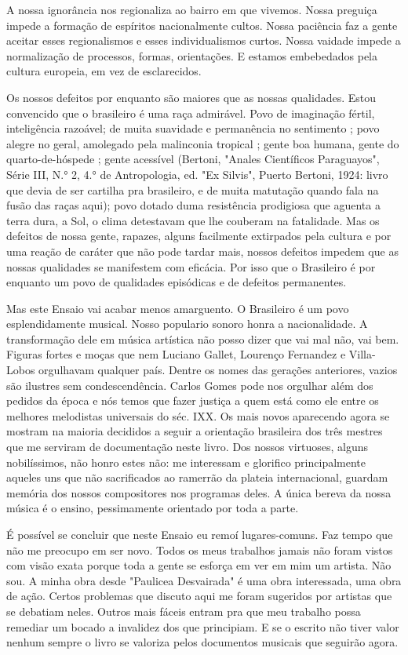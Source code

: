 A nossa ignorância nos regionaliza ao bairro em que vivemos. Nossa
preguiça impede a formação de espíritos nacionalmente cultos. Nossa
paciência faz a gente aceitar esses regionalismos e esses
individualismos curtos. Nossa vaidade impede a normalização de
processos, formas, orientações. E estamos embebedados pela cultura
europeia, em vez de esclarecidos.~

Os nossos defeitos por enquanto são maiores que as nossas qualidades.
Estou convencido que o brasileiro é uma raça admirável. Povo de
imaginação fértil, inteligência razoável; de muita suavidade e
permanência no sentimento ; povo alegre no geral, amolegado pela
malinconia tropical ; gente boa humana, gente do quarto-de-hóspede ;
gente acessível (Bertoni, "Anales Científicos Paraguayos", Série III,
N.° 2, 4.° de Antropologia, ed. "Ex Silvis", Puerto Bertoni, 1924: livro
que devia de ser cartilha pra brasileiro, e de muita matutação quando
fala na fusão das raças aqui); povo dotado duma resistência prodigiosa
que aguenta a terra dura, a Sol, o clima detestavam que lhe couberam na
fatalidade. Mas os defeitos de nossa gente, rapazes, alguns facilmente
extirpados pela cultura e por uma reação de caráter que não pode tardar
mais, nossos defeitos impedem que as nossas qualidades se manifestem com
eficácia. Por isso que o Brasileiro é por enquanto um povo de qualidades
episódicas e de defeitos permanentes.

Mas este Ensaio vai acabar menos amarguento. O Brasileiro é um povo
esplendidamente musical. Nosso populario sonoro honra a nacionalidade. A
transformação dele em música artística não posso dizer que vai mal não,
vai bem. Figuras fortes e moças que nem Luciano Gallet, Lourenço
Fernandez e Villa-Lobos orgulhavam qualquer país. Dentre os nomes das
gerações anteriores, vazios são ilustres sem condescendência. Carlos
Gomes pode nos orgulhar além dos pedidos da época e nós temos que fazer
justiça a quem está como ele entre os melhores melodistas universais do
séc. IXX. Os mais novos aparecendo agora se mostram na maioria decididos
a seguir a orientação brasileira dos três mestres que me serviram de
documentação neste livro. Dos nossos virtuoses, alguns nobilíssimos, não
honro estes não: me interessam e glorifico principalmente aqueles uns
que não sacrificados ao ramerrão da plateia internacional, guardam
memória dos nossos compositores nos programas deles. A única bereva da
nossa música é o ensino, pessimamente orientado por toda a parte.

É possível se concluir que neste Ensaio eu remoí lugares-comuns. Faz
tempo que não me preocupo em ser novo. Todos os meus trabalhos jamais
não foram vistos com visão exata porque toda a gente se esforça em ver
em mim um artista. Não sou. A minha obra desde "Paulicea Desvairada" é
uma obra interessada, uma obra de ação. Certos problemas que discuto
aqui me foram sugeridos por artistas que se debatiam neles. Outros mais
fáceis entram pra que meu trabalho possa remediar um bocado a invalidez
dos que principiam. E se o escrito não tiver valor nenhum sempre o livro
se valoriza pelos documentos musicais que seguirão agora.


